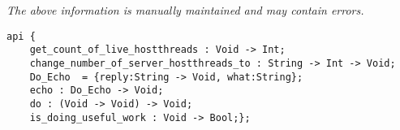 \label{api:Cpu\_Bound\_Task\_Hostthreads}

{\tiny \it The above information is manually maintained and may contain errors.}
\begin{verbatim}
api {
    get_count_of_live_hostthreads : Void -> Int;
    change_number_of_server_hostthreads_to : String -> Int -> Void;
    Do_Echo  = {reply:String -> Void, what:String};
    echo : Do_Echo -> Void;
    do : (Void -> Void) -> Void;
    is_doing_useful_work : Void -> Bool;};
\end{verbatim}
